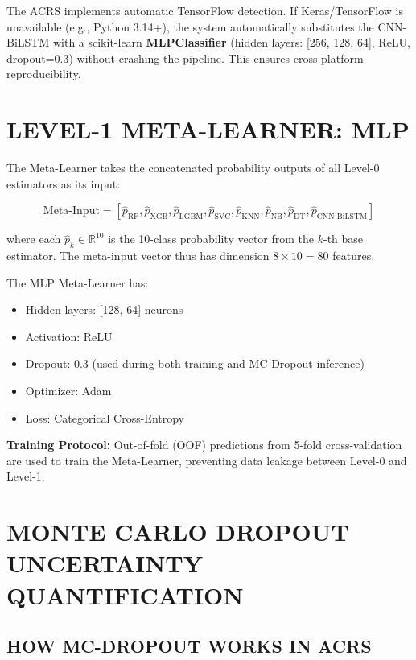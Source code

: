 \documentclass[12pt,a4paper,oneside]{report}
\begin{document}
The ACRS implements automatic TensorFlow detection. If Keras/TensorFlow is unavailable (e.g., Python 3.14+), the system automatically substitutes the CNN-BiLSTM with a scikit-learn \textbf{MLPClassifier} (hidden layers: [256, 128, 64], ReLU, dropout=0.3) without crashing the pipeline. This ensures cross-platform reproducibility.

\section{LEVEL-1 META-LEARNER: MLP}

The Meta-Learner takes the concatenated probability outputs of all Level-0 estimators as its input:

\begin{equation}
\text{Meta-Input} = \left[\hat{p}_{\text{RF}}, \hat{p}_{\text{XGB}}, \hat{p}_{\text{LGBM}}, \hat{p}_{\text{SVC}}, \hat{p}_{\text{KNN}}, \hat{p}_{\text{NB}}, \hat{p}_{\text{DT}}, \hat{p}_{\text{CNN-BiLSTM}}\right]
\end{equation}

where each $\hat{p}_k \in \mathbb{R}^{10}$ is the 10-class probability vector from the $k$-th base estimator. The meta-input vector thus has dimension $8 \times 10 = 80$ features.

The MLP Meta-Learner has:
\begin{itemize}[leftmargin=*, label=$\bullet$]
  \item Hidden layers: [128, 64] neurons
  \item Activation: ReLU
  \item Dropout: 0.3 (used during both training and MC-Dropout inference)
  \item Optimizer: Adam
  \item Loss: Categorical Cross-Entropy
\end{itemize}

\textbf{Training Protocol:} Out-of-fold (OOF) predictions from 5-fold cross-validation are used to train the Meta-Learner, preventing data leakage between Level-0 and Level-1.

\section{MONTE CARLO DROPOUT UNCERTAINTY QUANTIFICATION}

\subsection{HOW MC-DROPOUT WORKS IN ACRS}
\end{document}
